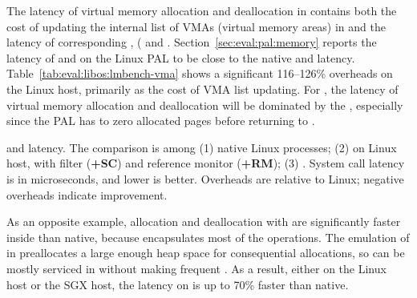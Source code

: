 \label{sec:eval:libos:vma}

The latency of virtual memory allocation
and deallocation in \thelibos{}
contains both the cost of updating the internal list of VMAs (virtual memory areas) in \thelibos{}
and the latency of corresponding \hostapis{}, ( and .
Section~\ref{sec:eval:pal:memory}
reports the latency of  and 
on the Linux PAL
to be close to the native 
and  latency.
Table~\ref{tab:eval:libos:lmbench-vma} shows a significant 116--126\% overheads
on the Linux host,
primarily as the cost of VMA list updating.
For \graphenesgx{},
the latency of virtual memory allocation
and deallocation will be dominated by the \hostapis{}, especially since the \sgx{} PAL has to zero allocated pages before returning to \thelibos{}.



\begin{table}[t!b!]

\caption{ and  latency. The comparison is among (1) native Linux processes; (2) \graphene{} on Linux host, with \seccomp{} filter ({\bf +SC}) and reference monitor ({\bf +RM}); (3) \graphenesgx{}.
System call latency is in microseconds, and lower is better.
Overheads are relative to Linux; negative overheads indicate improvement.} 
\label{tab:eval:libos:lmbench-vma}
\end{table}


As an opposite example, allocation and deallocation
with  are
significantly faster inside \thelibos{}
than native,
because \thelibos{} encapsulates most of the operations.
The emulation of  in \thelibos{}
preallocates a large enough
heap space for consequential allocations,
so  can be mostly serviced in \thelibos{}
without making frequent \hostapis{}.
As a result, either on the Linux host or the SGX host,
the latency on 
is up to 70\% faster than native.

